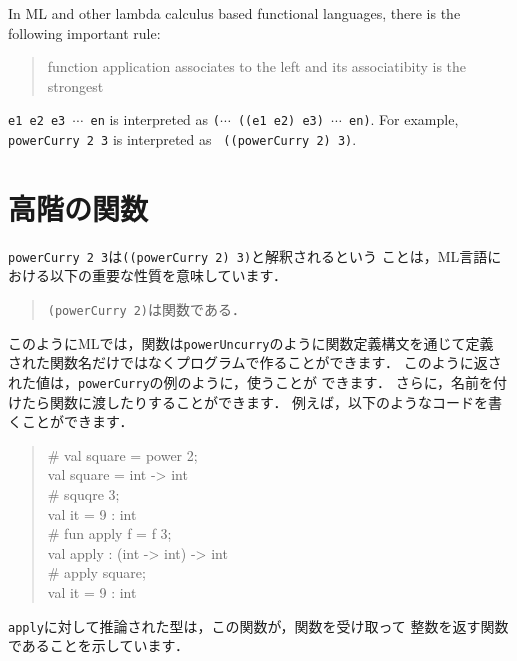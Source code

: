 \documentclass{jbook}
\newif\ifjp
\newcommand{\txt}[2]{#1}
\begin{document}
	In ML and other lambda calculus based functional languages, 
there is the following important rule:
\begin{quote}
function application associates to the left and its associatibity is the strongest
\end{quote}
	{\tt e1\ e2\ e3\ $\cdots$\ en} is interpreted as {\tt ($\cdots$
((e1\ e2)\ e3)\ $\cdots$\ en)}.
	For example, {\tt powerCurry 2 3} is interpreted as {\tt
((powerCurry 2) 3)}.
\fi%

\section{\txt{高階の関数}{Higher-order functions}}
\label{sec:tutorialHeigher-order-fun}

\ifjp%
	{\tt powerCurry 2 3}は{\tt ((powerCurry 2) 3)}と解釈されるという
ことは，ML言語における以下の重要な性質を意味しています．
\begin{quote}
{\tt (powerCurry 2)}は関数である．
\end{quote}
	このようにMLでは，関数は{\tt powerUncurry}のように関数定義構文を通じて定義
された関数名だけではなくプログラムで作ることができます．
	このように返された値は，{\tt powerCurry}の例のように，使うことが
できます．
	さらに，名前を付けたら関数に渡したりすることができます．
	例えば，以下のようなコードを書くことができます．
\begin{tt}
\begin{quote}
\# val square = power 2;\\
val square = int -> int\\
\# squqre 3;\\
val it = 9 : int\\
\# fun apply f = f 3;\\
val apply : (int -> int) -> int\\
\# apply square;\\
val it = 9 : int
\end{quote}
\end{tt}
	{\tt apply}に対して推論された型は，この関数が，関数を受け取って
整数を返す関数であることを示しています．
\end{document}
